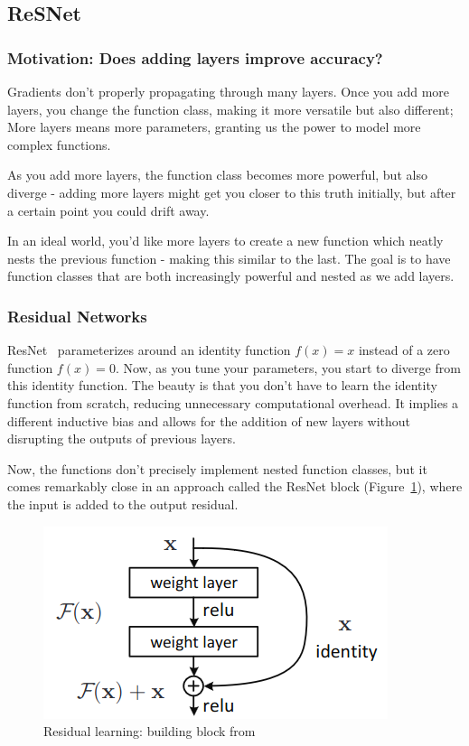 \documentclass[11pt]{article}
\begin{document}
\subsection{ReSNet}

\subsubsection{Motivation: Does adding layers improve accuracy?}

Gradients don't properly propagating through many layers. Once you add more layers, you change the function class, making it more versatile but also different; More layers means more parameters, granting us the power to model more complex functions.

As you add more layers, the function class becomes more powerful, but also diverge - adding more layers might get you closer to this truth initially, but after a certain point you could drift away.

In an ideal world, you'd like more layers to create a new function which neatly nests the previous function - making this similar to the last.  The goal is to have function classes that are both increasingly powerful and nested as we add layers.

\subsubsection{Residual Networks}

ResNet~\cite{ResNet} parameterizes around an identity function $f(x)=x$ instead of a zero function $f(x)=0$. Now, as you tune your parameters, you start to diverge from this identity function. The beauty is that you don't have to learn the identity function from scratch, reducing unnecessary computational overhead. It implies a different inductive bias and allows for the addition of new layers without disrupting the outputs of previous layers.

Now, the functions don't precisely implement nested function classes, but it comes remarkably close in an approach called the ResNet block (Figure~\ref{fig:resblock}), where the input is added to the output residual.

\begin{figure}[H]
    \centering
    \includegraphics[width=.5\linewidth]{figures/ResBlock.png}
    \caption{Residual learning: building block from~\cite{ResNet}}
    \label{fig:resblock}
\end{figure}
\end{document}
